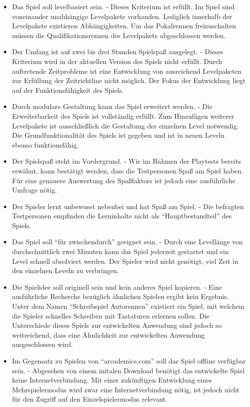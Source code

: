 \begin{itemize}
    \item{Das Spiel soll levelbasiert sein. - Dieses Kriterium ist erfüllt. Im Spiel sind voneinander unabhängige Levelpakete vorhanden. Lediglich innerhalb der Levelpakete existieren Abhängigkeiten. Um das Pokalrennen freizuschalten müssen die Qualifikationsrennen des Levelpakets abgeschlossen werden.}
    \item{Der Umfang ist auf zwei bis drei Stunden Spielspaß ausgelegt. - Dieses Kriterium wird in der aktuellen Version des Spiels nicht erfüllt. Durch auftretende Zeitprobleme ist eine Entwicklung von ausreichend Levelpaketen zur Erfüllung der Zeitrichtline nicht möglich. Der Fokus der Entwicklung liegt auf der Funktionsfähigkeit des Spiels.}
    \item{Durch modulare Gestaltung kann das Spiel erweitert werden. - Die Erweiterbarkeit des Spiels ist vollständig erfüllt. Zum Hinzufügen weiterer Levelpakete ist ausschließlich die Gestaltung der einzelnen Level notwendig. Die Grundfunktionalität des Spiels ist gegeben und ist in neuen Leveln ebenso funktionsfähig.}
    \item{Der Spielspaß steht im Vordergrund. - Wie im Rahmen der Playtests bereits erwähnt, kann bestätigt werden, dass die Testpersonen Spaß am Spiel haben. Für eine genauere Auswertung des Spaßfaktors ist jedoch eine ausführliche Umfrage nötig. }
    \item{Der Spieler lernt unbewusst nebenbei und hat Spaß am Spiel. - Die befragten Testpersonen empfinden die Lerninhalte nicht als \enquote{Hauptbestandteil} des Spiels.}
    \item{Das Spiel soll \enquote{für zwischendurch} geeignet sein. - Durch eine Levellänge von durchschnittlich zwei Minuten kann das Spiel jederzeit gestartet und ein Level schnell absolviert werden. Der Spieler wird nicht genötigt, viel Zeit in den einzelnen Leveln zu verbringen.}
    \item{Die Spielidee soll originell sein und kein anderes Spiel kopieren. - Eine ausführliche Recherche bezüglich ähnlichen Spielen ergibt kein Ergebnis. Unter dem Namen \enquote{Schreibspiel Autorennen} existiert ein Spiel, mit welchem die Spieler schnelles Schreiben mit Tastaturen erlernen sollen. Die Unterschiede dieses Spiels zur entwickelten Anwendung sind jedoch so weitreichend, dass eine Ähnlichkeit zur entwickelten Anwendung ausgeschlossen wird.}
    \item{Im Gegensatz zu Spielen von \enquote{arcademics.com} soll das Spiel offline verfügbar sein. - Abgesehen von einem initalen Download benötigt das entwickelte Spiel keine Internetverbindung. Mit einer zukünftigen Entwicklung eines Mehrspielermodus wird zwar eine Internetverbindung nötig, ist jedoch nicht für den Zugriff auf den Einzelspielermodus relevant.}

\end{itemize}
